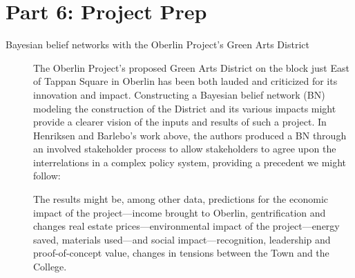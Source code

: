 \documentclass[11pt]{amsart}
\begin{document}
\section*{Part 6: Project Prep}

\begin{description}

\item[Bayesian belief networks with the Oberlin Project's Green Arts District]
The Oberlin Project's proposed Green Arts District on the block just East of Tappan Square in Oberlin has been both
lauded and criticized for its innovation and impact.  Constructing a Bayesian belief network (BN) modeling the
construction of the District and its various impacts might provide a clearer vision of the inputs and results of such a
project.  In Henriksen and Barlebo's work above, the authors produced a BN through an involved stakeholder process to
allow stakeholders to agree upon the interrelations in a complex policy system, providing a precedent we might follow:
\renewcommand{\theenumi}{(\roman{enumi})}
\renewcommand{\labelenumi}{\theenumi}
\renewcommand{\theenumi}{\alph{enumi}.}
\renewcommand{\labelenumi}{\theenumi}
The results might be, among other data, predictions for the economic impact of the project\----income brought to
Oberlin, gentrification and changes real estate prices\----environmental impact of the project\----energy saved,
materials used\----and social impact\----recognition, leadership and proof-of-concept value, changes in tensions between
the Town and the College.


\end{description}
\end{document}
